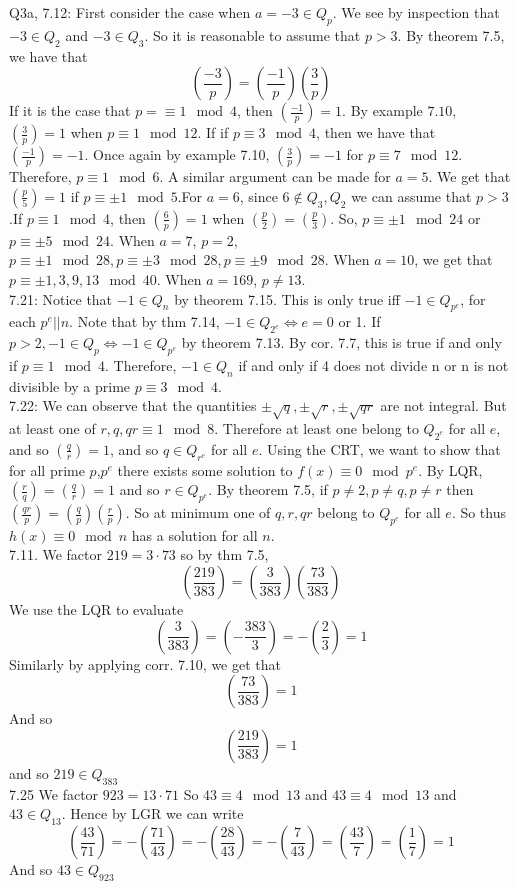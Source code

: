\documentclass[letterpaper]{article}
\begin{document}
\noindent Q3a, 7.12: First consider the case when $a = -3\in Q_p$. We see by inspection that $-3\in Q_2$ and $-3\in Q_3$. So it is reasonable to assume that $p>3$. By theorem 7.5, we have that $$(\frac{-3}{p}) = (\frac{-1}{p})(\frac{3}{p})$$ If it is the case that $p=\equiv 1\mod{4}$, then $(\frac{-1}{p})=1$. By example $7.10$, $(\frac{3}{p})=1$ when $p\equiv 1 \mod{12}$. If if $p \equiv 3 \mod{4}$, then we have that $(\frac{-1}{p})= -1$. 
Once again by example 7.10, $(\frac{3}{p})=-1$ for $p\equiv 7\mod{12}$. Therefore, $p\equiv 1\mod{6}$. A similar argument can be made for $a=5$. We get that $(\frac{p}{5})=1$ if $p \equiv \pm 1 \mod{5}$.For $a=6$, since $6 \not \in Q_3,Q_2$ we can assume that $p>3$.If $p\equiv 1 \mod{4}$, then $(\frac{6}{p})=1$ when $(\frac{p}{2})= (\frac{p}{3})$. So, $p \equiv \pm 1 \mod{24}$ or $p \equiv \pm5 \mod{24}$. When $a=7$, $p=2$, $p \equiv \pm 1 \mod{28}, p \equiv \pm 3 \mod{28}, p\equiv \pm 9 \mod{28}$. When $a=10$, we get that $p \equiv \pm 1,3,9,13 \mod{40}$. When $a=169$, $p\neq 13$. 
\newline \\ 7.21: Notice that $-1\in Q_n$ by theorem 7.15. This is only true iff $-1\in Q_{p^e}$, for each $p^e ||n$. Note that by thm 7.14, $-1\in Q_{2^e} \iff e=0$ or 1. If $p>2, -1\in Q_p \iff -1\in Q_{p^e}$ by theorem 7.13. By cor. 7.7, this is true if and only if $p\equiv 1 \mod{4}$. Therefore, $-1\in Q_n$ if and only if 4 does not divide n or n is not divisible by a prime $p\equiv 3 \mod{4}$. 
\newline \\ 7.22: We can observe that the quantities $\pm \sqrt{q}, \pm \sqrt{r}, \pm \sqrt{qr}$ are not integral. But at least one of $r,q,qr\equiv 1\mod{8}$. Therefore at least one belong to $Q_{2^e}$ for all $e$, and so $(\frac{q}{r})=1$, and so $q\in Q_{r^e}$ for all $e$. Using the CRT, we want to show that for all prime $p$,$p^e$ there exists some solution to $f(x)\equiv 0 \mod{p^e}$. By LQR, $(\frac{r}{q}) = (\frac{q}{r})=1$ and so $r\in Q_{p^e}$. By theorem 7.5, if $p\neq 2, p\neq q,p \neq r$ then $(\frac{qr}{p}) = (\frac{q}{p})(\frac{r}{p})$. So at minimum one of $q,r,qr$ belong to $Q_{p^e}$ for all $e$. So thus $h(x)\equiv 0 \mod{n}$ has a solution for all $n$.
\newline \\ 7.11. We factor $219=3\cdot 73$ so by thm 7.5, $$(\frac{219}{383}) = (\frac{3}{383})(\frac{73}{383})$$ We use the LQR to evaluate $$(\frac{3}{383}) = (-\frac{383}{3}) = -(\frac{2}{3})=1$$ Similarly by applying corr. 7.10, we get that $$(\frac{73}{383}) = 1$$ And so $$(\frac{219}{383})=1$$ and so $219\in Q_{383}$
\newline \\ 7.25 We factor $923=13\cdot 71$ So $43 \equiv 4 \mod{13}$ and $43\equiv 4 \mod{13}$ and $43\in Q_{13}$. Hence by LGR we can write $$(\frac{43}{71}) = - (\frac{71}{43}) = -(\frac{28}{43}) = -(\frac{7}{43}) = (\frac{43}{7}) =(\frac{1}{7}) = 1$$ And so $43\in Q_{923}$
\end{document}
